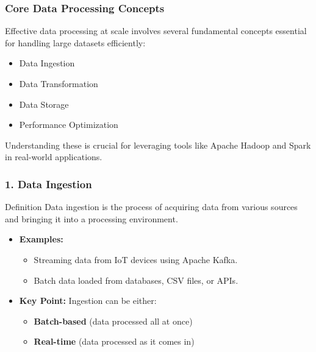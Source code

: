 \documentclass[aspectratio=169]{beamer}
\begin{document}
\begin{frame}[fragile]
    \frametitle{Core Data Processing Concepts}
    Effective data processing at scale involves several fundamental concepts essential for handling large datasets efficiently:
    \begin{itemize}
        \item Data Ingestion
        \item Data Transformation
        \item Data Storage
        \item Performance Optimization
    \end{itemize}
    Understanding these is crucial for leveraging tools like Apache Hadoop and Spark in real-world applications.
\end{frame}

\begin{frame}[fragile]
    \frametitle{1. Data Ingestion}
    \begin{block}{Definition}
        Data ingestion is the process of acquiring data from various sources and bringing it into a processing environment.
    \end{block}
    \begin{itemize}
        \item \textbf{Examples:}
        \begin{itemize}
            \item Streaming data from IoT devices using Apache Kafka.
            \item Batch data loaded from databases, CSV files, or APIs.
        \end{itemize}
        \item \textbf{Key Point:} Ingestion can be either:
        \begin{itemize}
            \item \textbf{Batch-based} (data processed all at once)
            \item \textbf{Real-time} (data processed as it comes in)
        \end{itemize}
    \end{itemize}
\end{frame}
\end{document}
